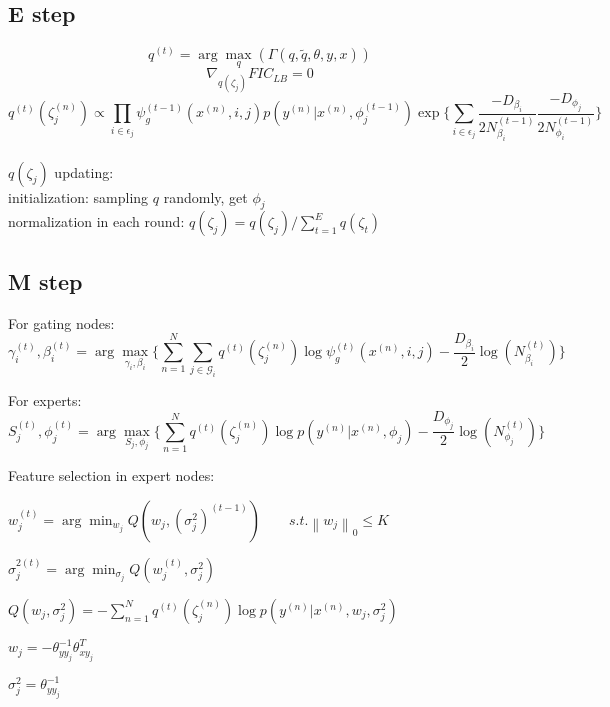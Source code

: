 \documentclass{article}
\begin{document}
\subsection{E step}
$$ q^{(t)} = \arg\max_q(\Gamma(q,\tilde{q},\theta,y,x)) $$
$$ \nabla_{q(\zeta_j)} FIC_{LB}= 0 $$
$$ q^{(t)}(\zeta_j^{(n)}) \propto \prod_{i \in \epsilon_j} 
	\psi_g^{(t-1)} (x^{(n)},i,j) p(y^{(n)}|x^{(n)},\phi_j^{(t-1)}) 
		\exp \{ \sum_{i \in \epsilon_j} 
			\frac{-D_{\beta_i}}{2N_{\beta_i}^{(t-1)}} 
				\frac{-D_{\phi_j}}{2N_{\phi_i}^{(t-1)}} \} $$ \\
				
$ q(\zeta_j) $ updating: \\
initialization: sampling $q$ randomly, get $\phi_j$ \\
normalization in each round: $ q(\zeta_j) = q(\zeta_j)/\sum_{t=1}^{E} q(\zeta_t) $ \\

\subsection{M step}
For gating nodes: \\
$$ \gamma_i^{(t)},\beta_i^{(t)} = \arg\max_{\gamma_i,\beta_i} 
	\{ \sum_{n=1}^{N}
	\sum_{j \in \mathcal{G}_i}q^{(t)}(\zeta_j^{(n)})
	\log\psi_g^{(t)} (x^{(n)},i,j)
	-\frac{D_{\beta_i}}{2}\log(N_{\beta_i}^{(t)})
	 \} $$ 
	 
For experts: \\
$$ S_j^{(t)}, \phi_j^{(t)} = \arg\max_{S_j,\phi_j}
	\{   \sum_{n=1}^{N}q^{(t)}(\zeta_j^{(n)})
	\log p(y^{(n)} | x^{(n)},\phi_j)
	-\frac{D_{\phi_j}}{2}\log(N_{\phi_j}^{(t)})
	\} $$	 

Feature selection in expert nodes: \\
\begin{description}
\setlength{\itemindent}{5em}
\item $ w_j^{(t)} = \arg\min_{w_j} Q(w_j,(\sigma_j^2)^{(t-1)}) 
	\qquad s.t. \left \| w_j\right \|_0 \le K $ \\
\item $ \sigma_j^{2(t)} = \arg\min_{\sigma_j} Q(w_j^{(t)}, \sigma_j^2) $ \\
\item $ Q(w_j, \sigma_j^2) = -\sum_{n=1}^{N} q^{(t)} (\zeta_j^{(n)}) 
	\log p(y^{(n)} | x^{(n)}, w_j, \sigma_j^2 ) $ \\
\item $ w_j = -\theta^{-1}_{yy_j}\theta^T_{xy_j} $ \\
\item $ \sigma^2_j = \theta^{-1}_{yy_j} $ \\
\end{description}
\end{document}
